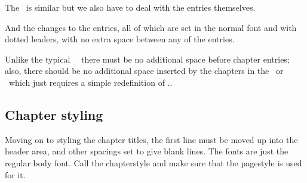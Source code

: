     The \toc\ is similar but we also have to deal with the entries themselves.
\begin{lcode}
\renewcommand{\contentsname}{TABLE OF CONTENTS}
\addtodef{\tableofcontents}{\clearpage\pagestyle{toc}}{}
\renewcommand*{\tocheadstart}{\vspace*{-\topfiddle}}
\renewcommand*{\aftertoctitle}{\thispagestyle{plain}%
  \par\nobreak \mbox{}\hfill{\normalfont Page}\par\nobreak}
\end{lcode}
And the changes to the entries, all of which are set in the normal font
and with dotted leaders, with no extra space between any of the entries.
\begin{lcode}
\renewcommand*{\cftchapterfont}{\normalfont}
\renewcommand*{\cftchapterpagefont}{\normalfont}
\renewcommand*{\cftchapterleader}{%
  \cftchapterfont\cftdotfill{\cftchapterdotsep}}
\renewcommand*{\cftchapterdotsep}{\cftdotsep}
\end{lcode}
Unlike the typical \ltx\ \toc\ there must be no additional space before
chapter entries; also, there should be no additional space inserted by
the chapters in the \lof\ or \lot\ which just requires a simple redefinition
of \cmd{\insertchapterspace}..
\begin{lcode}
\setlength{\cftbeforechapterskip}{0pt plus 0pt}
\renewcommand*{\insertchapterspace}{}
\end{lcode}

\subsection{Chapter styling}

    Moving on to styling the chapter titles, the first line must be moved up
into the header area, and other spacings set to give blank lines. The fonts
are just the regular body font. Call the chapterstyle  and make
sure that the  pagestyle is used for it.

\begin{lcode}

\end{lcode}

